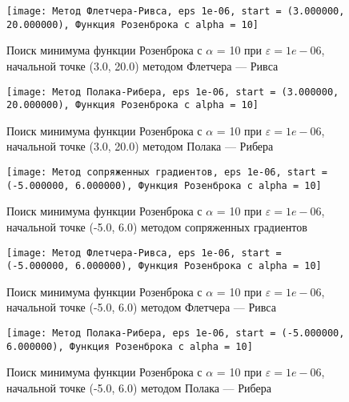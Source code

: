             \begin{figure}[H]
	        \centering
	        \texttt{[image: Метод Флетчера-Ривса, eps 1e-06, start = (3.000000, 20.000000), Функция Розенброка с alpha = 10]}%
	        \caption{Поиск минимума функции Розенброка с $\alpha$ = 10 при $\varepsilon = 1e-06$, начальной точке (3.0, 20.0) методом Флетчера --- Ривса}
	        \vspace*{-1.2cm}
            \end{figure}
            
            \begin{figure}[H]
	        \centering
	        \texttt{[image: Метод Полака-Рибера, eps 1e-06, start = (3.000000, 20.000000), Функция Розенброка с alpha = 10]}%
	        \caption{Поиск минимума функции Розенброка с $\alpha$ = 10 при $\varepsilon = 1e-06$, начальной точке (3.0, 20.0) методом Полака --- Рибера}
	        \vspace*{-1.2cm}
            \end{figure}
            
            \begin{figure}[H]
	        \centering
	        \texttt{[image: Метод сопряженных градиентов, eps 1e-06, start = (-5.000000, 6.000000), Функция Розенброка с alpha = 10]}%
	        \caption{Поиск минимума функции Розенброка с $\alpha$ = 10 при $\varepsilon = 1e-06$, начальной точке (-5.0, 6.0) методом сопряженных градиентов}
	        \vspace*{-1.2cm}
            \end{figure}
            
            \begin{figure}[H]
	        \centering
	        \texttt{[image: Метод Флетчера-Ривса, eps 1e-06, start = (-5.000000, 6.000000), Функция Розенброка с alpha = 10]}%
	        \caption{Поиск минимума функции Розенброка с $\alpha$ = 10 при $\varepsilon = 1e-06$, начальной точке (-5.0, 6.0) методом Флетчера --- Ривса}
	        \vspace*{-1.2cm}
            \end{figure}
            
            \begin{figure}[H]
	        \centering
	        \texttt{[image: Метод Полака-Рибера, eps 1e-06, start = (-5.000000, 6.000000), Функция Розенброка с alpha = 10]}%
	        \caption{Поиск минимума функции Розенброка с $\alpha$ = 10 при $\varepsilon = 1e-06$, начальной точке (-5.0, 6.0) методом Полака --- Рибера}
	        \vspace*{-1.2cm}
            \end{figure}
            
